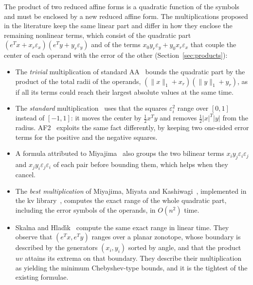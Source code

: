 \documentclass[10pt]{article}
\theoremstyle{definition}
\newcommand{\eps}{\varepsilon}
\newcommand{\ex}{\eps_x}
\newcommand{\ey}{\eps_y}
\begin{document}
The product of two reduced affine forms is a quadratic function of the symbols and must be enclosed by a new reduced affine form. The multiplications proposed in the literature keep the same linear part and differ in how they enclose the remaining nonlinear terms, which consist of the quadratic part $(e^Tx+x_r\ex)(e^Ty+y_r\ey)$ and of the terms $x_0y_r\ey+y_0x_r\ex$ that couple the center of each operand with the error of the other (Section~\ref{sec:products}):
\begin{itemize}
\item The \emph{trivial} multiplication of standard AA~\cite{stolfi1997self} bounds the quadratic part by the product of the total radii of the operands, $(\|x\|_1+x_r)(\|y\|_1+y_r)$, as if all its terms could reach their largest absolute values at the same time.
\item The \emph{standard} multiplication~\cite{kolev2004improved,vu2009enhancing} uses that the squares $\eps_i^2$ range over $[0,1]$ instead of $[-1,1]$: it moves the center by $\tfrac12x^Ty$ and removes $\tfrac12|x|^T|y|$ from the radius. AF2~\cite{messine2002extentions} exploits the same fact differently, by keeping two one-sided error terms for the positive and the negative squares.
\item A formula attributed to Miyajima~\cite{skalna2017new} also groups the two bilinear terms $x_iy_j\eps_i\eps_j$ and $x_jy_i\eps_j\eps_i$ of each pair before bounding them, which helps when they cancel.
\item The \emph{best multiplication} of Miyajima, Miyata and Kashiwagi~\cite{miyajima2003best}, implemented in the kv library~\cite{kvlib}, computes the exact range of the whole quadratic part, including the error symbols of the operands, in $O(n^2)$ time.
\item Skalna and Hlad\'{\i}k~\cite{skalna2017new} compute the same exact range in linear time. They observe that $(e^Tx,e^Ty)$ ranges over a planar zonotope, whose boundary is described by the generators $(x_i,y_i)$ sorted by angle, and that the product $uv$ attains its extrema on that boundary. They describe their multiplication as yielding the minimum Chebyshev-type bounds, and it is the tightest of the existing formulae.
\end{itemize}
\end{document}
